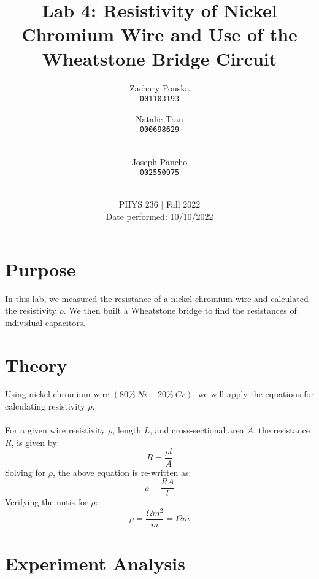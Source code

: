 \documentclass[titlepage]{article}
\begin{document}
\title{\textbf{Lab 4: Resistivity of Nickel Chromium Wire and Use of the Wheatstone Bridge Circuit}}
\author{
    Zachary Pouska\\
    \texttt{001103193}\\
    \and
    Natalie Tran \\ 
    \texttt{000698629}\\ \\
    \and
    Joseph Pancho\\
    \texttt{002550975} \\ \\
} 

\date{PHYS 236 | Fall 2022\\
Date performed: 10/10/2022}


	\maketitle



	\section{Purpose}
	In this lab, we measured the resistance of a nickel chromium wire 
	and calculated the resistivity $\rho$. We then built a Wheatstone 
	bridge to find the resistances of individual capacitors.

	\section{Theory}
	Using nickel chromium wire $(80\%~Ni- 20\%~Cr)$, we will apply the 
	equations for calculating resistivity $\rho$. \\
	~\\
	For a given wire resistivity $\rho$, length $L$, and cross-sectional 
	area $A$, the resistance $R$, is given by: \\
	\[
		R=\frac{\rho l}{A}
	\]
	Solving for $\rho$, the above equation is re-written as:
	\[
		\rho = \frac{RA}{l}
	\]	 
	Verifying the untis for $\rho$: 
	\[
		\rho=\frac{\Omega m^2}{m}=\Omega m	
	\]
	\section{Experiment Analysis}
    
\end{document}
